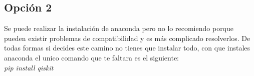 \documentclass[12pt,letterpaper]{report}
\begin{document}
\subsection*{Opci\'on 2}
Se puede realizar la instalaci\'on de anaconda pero no lo recomiendo porque pueden existir problemas de compatibilidad y es m\'as complicado resolverlos. De todas formas si decides este camino no tienes que instalar todo, con que instales anaconda el unico comando que te faltara es el siguiente:\\
\textit{pip install qiskit}\\
\end{document}
